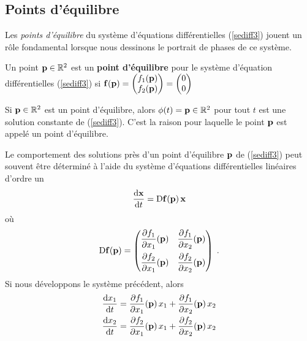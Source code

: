 {

\subsection{Points d'équilibre}

Les {\em points d'équilibre} du système d'équations différentielles
(\ref{sediff3}) jouent un rôle fondamental lorsque nous dessinons le
portrait de phases de ce système.

\begin{defn}
Un point $\mathbf{p} \in \mathbb{R}^2$ est un {\bfseries point
d'équilibre} pour le système d'équation différentielles (\ref{sediff3}) si
$\displaystyle \mathbf{f}(\mathbf{p}) =
\begin{pmatrix}
f_1(\mathbf{p}) \\ f_2(\mathbf{p})
\end{pmatrix} =
\begin{pmatrix}
0 \\ 0
\end{pmatrix}
$
\end{defn}

Si $\mathbf{p}\in \mathbb{R}^2$ est un point d'équilibre, alors
$\phi(t) = \mathbf{p} \in \mathbb{R}^2$ pour tout $t$ est une solution constante
de (\ref{sediff3}).  C'est la raison pour laquelle le point $\mathbf{p}$
est appelé un point d'équilibre.

Le comportement des solutions près d'un point d'équilibre $\mathbf{p}$ de
(\ref{sediff3}) peut souvent être déterminé à l'aide du
système d'équations différentielles linéaires d'ordre un
\begin{equation}\label{sediff4}
\frac{\mathrm{d}\mathbf{x}}{\mathrm{d}t} = \mathrm{D} \mathbf{f}(\mathbf{p}) \, \mathbf{x}
\end{equation}
où
\[
\mathrm{D} \mathbf{f}(\mathbf{p}) =
\begin{pmatrix}
\displaystyle \frac{\partial f_1}{\partial x_1}(\mathbf{p}) &
\displaystyle \frac{\partial f_1}{\partial x_2}(\mathbf{p}) \\[1em]
\displaystyle \frac{\partial f_2}{\partial x_1}(\mathbf{p}) &
\displaystyle \frac{\partial f_2}{\partial x_2}(\mathbf{p})
\end{pmatrix} \; .
\]
Si nous développons le système précédent, alors
\begin{align*}
\frac{\mathrm{d}x_1}{\mathrm{d}t} &= \frac{\partial f_1}{\partial x_1}(\mathbf{p})\,x_1 +
\frac{\partial f_1}{\partial x_2}(\mathbf{p})\,x_2 \\
\frac{\mathrm{d}x_2}{\mathrm{d}t} &= \frac{\partial f_2}{\partial x_1}(\mathbf{p})\,x_1 +
\frac{\partial f_2}{\partial x_2}(\mathbf{p})\,x_2 \\
\end{align*}

}

